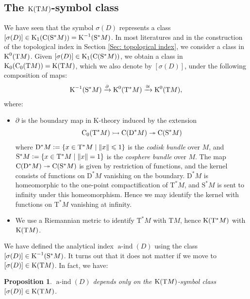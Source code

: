 \documentclass[reqno]{scrartcl}
\newtheorem{proposition}[theorem]{Proposition}
\theoremstyle{definition}
\theoremstyle{remark}
\newcommand{\aind}{\operatorname{a-ind}}
\begin{document}
\subsection{The $\operatorname{K}(\mathrm{T}M)$-symbol class}
We have seen that the symbol $\sigma(D)$ represents a class $[\sigma(D)]\in\operatorname{K}_1(\mathrm{C}(\mathrm{S}^*M))=\operatorname{K}^{-1}(\mathrm{S}^*M)$. In most literatures and in the construction of the topological index in Section \ref{Sec: topological index}, we consider a class in $\operatorname{K}^0(\mathrm{T}M)$. Given $[\sigma(D)]\in\operatorname{K}_1(\mathrm{C}(\mathrm{S}^*M))$, we obtain a class in $\operatorname{K}_0(\mathrm{C}_0(\mathrm{T}M))=\operatorname{K}(\mathrm{T}M)$, which we also denote by $[\sigma(D)]$, under the following composition of maps:
\[ \operatorname{K}^{-1}(\mathrm{S}^*M)\xrightarrow{\partial}\operatorname{K}^0(\mathrm{T}^*M)\xrightarrow{\cong}\operatorname{K}^0(\mathrm{T}M), \]
where:
\begin{itemize}
\item $\partial$ is the boundary map in K-theory induced by the extension
\begin{equation} \label{Eqn: disk-sphere extension}
\mathrm{C}_0(\mathrm{T}^*M)\rightarrowtail\mathrm{C}(\mathrm{D}^*M)\twoheadrightarrow\mathrm{C}(\mathrm{S}^*M)
\end{equation}
where $\mathrm{D}^*M\mathrel{\vcentcolon=}\{x\in \mathrm{T}^*M\mid\lVert x\rVert\leqslant 1\}$ is the \emph{codisk bundle} over $M$, and $\mathrm{S}^*M\mathrel{\vcentcolon=}\{x\in \mathrm{T}^*M\mid\lVert x\rVert=1\}$ is the \emph{cosphere bundle} over $M$. The map $\mathrm{C}(\mathrm{D}^*M)\twoheadrightarrow\mathrm{C}(\mathrm{S}^*M)$ is given by restriction of functions, and the kernel consists of functions on $\mathrm{D}^*M$ vanishing on the boundary. $\mathrm{D}^*M$ is homeomorphic to the one-point compactification of $\mathrm{T}^*M$, and $\mathrm{S}^*M$ is sent to infinity under this homeomorphism. Hence we may identify the kernel with functions on $\mathrm{T}^*M$ vanishing at infinity.
\item We use a Riemannian metric to identify $\mathrm{T}^*M$ with $\mathrm{T}M$, hence $\operatorname{K}(\mathrm{T}^*M)$ with $\operatorname{K}(\mathrm{T}M)$.
\end{itemize}

We have defined the analytical index $\aind(D)$ using the class $[\sigma(D)]\in\operatorname{K}^{-1}(\mathrm{S}^*M)$. It turns out that it does not matter if we move to $[\sigma(D)]\in\operatorname{K}(\mathrm{T}M)$. In fact, we have:
\begin{proposition}
$\aind(D)$ depends only on the $\operatorname{K}(\mathrm{T}M)$-symbol class $[\sigma(D)]\in\operatorname{K}(\mathrm{T}M)$.
\end{proposition}
\end{document}
